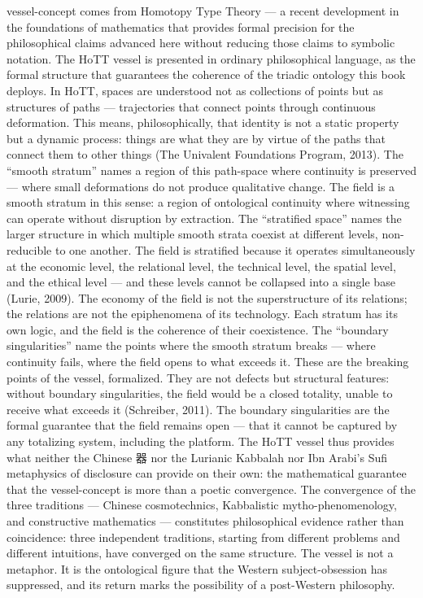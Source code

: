 vessel-concept comes from Homotopy Type Theory — a recent development in the foundations of mathematics that provides formal precision for the philosophical claims advanced here without reducing those claims to symbolic notation. The HoTT vessel is presented in ordinary philosophical language, as the formal structure that guarantees the coherence of the triadic ontology this book deploys. In HoTT, spaces are understood not as collections of points but as structures of paths — trajectories that connect points through continuous deformation. This means, philosophically, that identity is not a static property but a dynamic process: things are what they are by virtue of the paths that connect them to other things (The Univalent Foundations Program, 2013). The “smooth stratum” names a region of this path-space where continuity is preserved — where small deformations do not produce qualitative change. The field is a smooth stratum in this sense: a region of ontological continuity where witnessing can operate without disruption by extraction. The “stratified space” names the larger structure in which multiple smooth strata coexist at different levels, non-reducible to one another. The field is stratified because it operates simultaneously at the economic level, the relational level, the technical level, the spatial level, and the ethical level — and these levels cannot be collapsed into a single base (Lurie, 2009). The economy of the field is not the superstructure of its relations; the relations are not the epiphenomena of its technology. Each stratum has its own logic, and the field is the coherence of their coexistence. The “boundary singularities” name the points where the smooth stratum breaks — where continuity fails, where the field opens to what exceeds it. These are the breaking points of the vessel, formalized. They are not defects but structural features: without boundary singularities, the field would be a closed totality, unable to receive what exceeds it (Schreiber, 2011). The boundary singularities are the formal guarantee that the field remains open — that it cannot be captured by any totalizing system, including the platform. The HoTT vessel thus provides what neither the Chinese 器 nor the Lurianic Kabbalah nor Ibn Arabi’s Sufi metaphysics of disclosure can provide on their own: the mathematical guarantee that the vessel-concept is more than a poetic convergence. The convergence of the three traditions — Chinese cosmotechnics, Kabbalistic mytho-phenomenology, and constructive mathematics — constitutes philosophical evidence rather than coincidence: three independent traditions, starting from different problems and different intuitions, have converged on the same structure. The vessel is not a metaphor. It is the ontological figure that the Western subject-obsession has suppressed, and its return marks the possibility of a post-Western philosophy.

